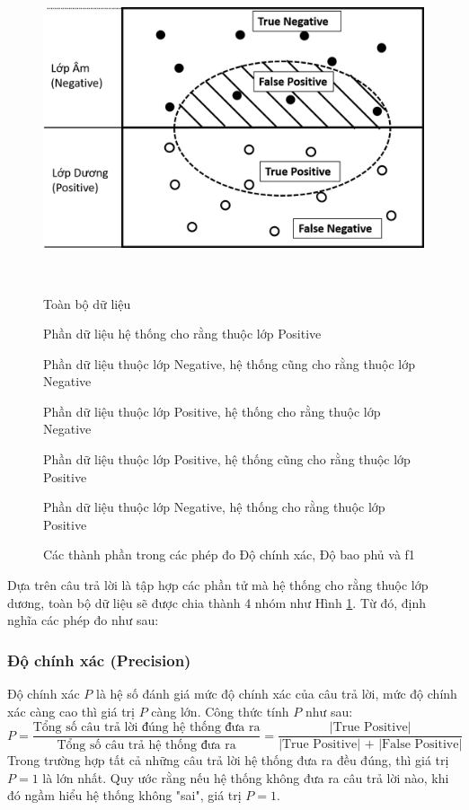 \begin{figure}[h]
\centering
\begin{minipage}{0.9\textwidth}
\includegraphics[scale=0.35]{../hinh/phepdo.png}
{\footnotesize \\
\begin{description}[noitemsep]
\item[Hình chữ nhật] Toàn bộ dữ liệu 
\item[Hình eclip] Phần dữ liệu hệ thống cho rằng thuộc lớp Positive
\item[True Negative] Phần dữ liệu thuộc lớp Negative, hệ thống cũng cho rằng thuộc lớp Negative
\item[False Negative] Phần dữ liệu thuộc lớp Positive, hệ thống cho rằng thuộc lớp Negative
\item[True Positive] Phần dữ liệu thuộc lớp Positive, hệ thống cũng cho rằng thuộc lớp Positive
\item[False Positive] Phần dữ liệu thuộc lớp Negative, hệ thống cho rằng thuộc lớp Positive
\end{description}
\par}
\end{minipage}
\caption{Các thành phần trong các phép đo Độ chính xác, Độ bao phủ và f1}
\label{fig:phepdo}
\end{figure}

Dựa trên câu trả lời là tập hợp các phần tử mà hệ thống cho rằng thuộc lớp dương, toàn bộ dữ liệu sẽ được chia thành 4 nhóm như Hình \ref{fig:phepdo}. Từ đó, định nghĩa các phép đo như sau:
\subsubsection*{Độ chính xác (Precision)}
Độ chính xác \(P\) là hệ số đánh giá mức độ chính xác của câu trả lời, mức độ chính xác càng cao thì giá trị \(P\) càng lớn. Công thức tính \(P\) như sau:
$$P=\frac{\text{Tổng số câu trả lời đúng hệ thống đưa ra}}{\text{Tổng số câu trả hệ thống đưa ra}} = \frac{\text{|True Positive|}}{\text{|True Positive| + |False Positive|}}$$
Trong trường hợp tất cả những câu trả lời hệ thống đưa ra đều đúng, thì giá trị $P=1$ là lớn nhất. Quy ước rằng nếu hệ thống không đưa ra câu trả lời nào, khi đó ngầm hiểu hệ thống không "sai", giá trị $P=1$.
